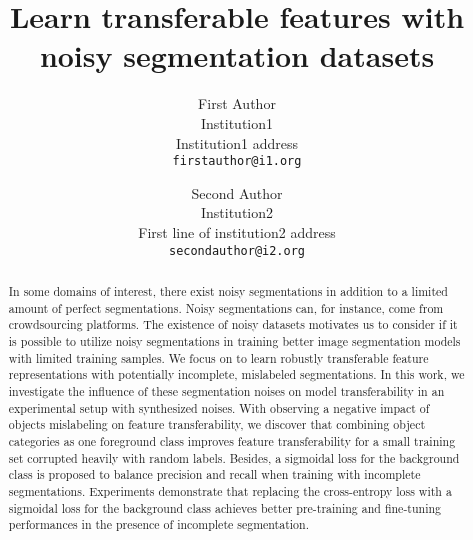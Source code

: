 \documentclass[10pt,twocolumn,letterpaper]{article}
\begin{document}
\onecolumn
{}


\twocolumn
{}
\newpage
\title{Learn transferable features with noisy segmentation datasets}

\author{First Author\\
Institution1\\
Institution1 address\\
{\tt\small firstauthor@i1.org}
\and
Second Author\\
Institution2\\
First line of institution2 address\\
{\tt\small secondauthor@i2.org}
}

\maketitle


\begin{abstract}


In some domains of interest, there exist noisy segmentations in addition to a limited amount of perfect segmentations.
Noisy segmentations can, for instance, come from crowdsourcing platforms.
The existence of noisy datasets motivates us to consider if it is possible to utilize noisy segmentations in training better image segmentation models with limited training samples.
We focus on to learn robustly transferable feature representations with potentially incomplete, mislabeled segmentations.
In this work, we investigate the influence of these segmentation noises on model transferability in an experimental setup with synthesized noises.
With observing a negative impact of objects mislabeling on feature transferability, we discover that combining object categories as one foreground class improves feature transferability for a small training set corrupted heavily with random labels.
Besides, a sigmoidal loss for the background class is proposed to balance precision and recall when training with incomplete segmentations.
Experiments demonstrate that replacing the cross-entropy loss with a sigmoidal loss for the background class achieves better pre-training and fine-tuning performances in the presence of incomplete segmentation.


\end{abstract}
\end{document}
